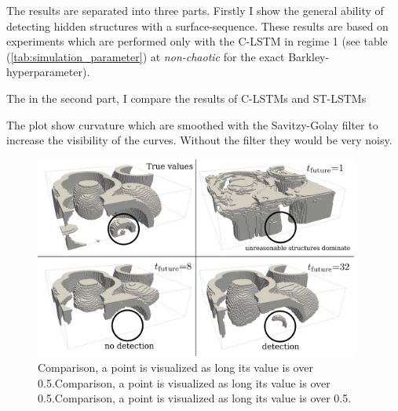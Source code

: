 The results are separated into three parts. Firstly I show the general ability of detecting hidden structures with a surface-sequence. These results are based on experiments which are performed only with the C-LSTM in regime 1 (see table (\ref{tab:simulation_parameter}) at \textit{non-chaotic} for the exact Barkley-hyperparameter).

The in the second part, I compare the results of C-LSTMs and ST-LSTMs

The plot show curvature which are smoothed with the Savitzy-Golay filter \cite{Savitzky1964SmoothingAD} to increase the visibility of the curves. Without the filter they would be very noisy.


\begin{figure}[!htb]
    \center
    \includegraphics[width=0.95\textwidth]{figures/CLSTM_p361_d32_t_1_8_32.png}
	\caption{Comparison, a point is visualized as long its value is over 0.5.Comparison, a point is visualized as long its value is over 0.5.Comparison, a point is visualized as long its value is over 0.5.}
	\label{fig:clstm_3d_p361}
\end{figure}

